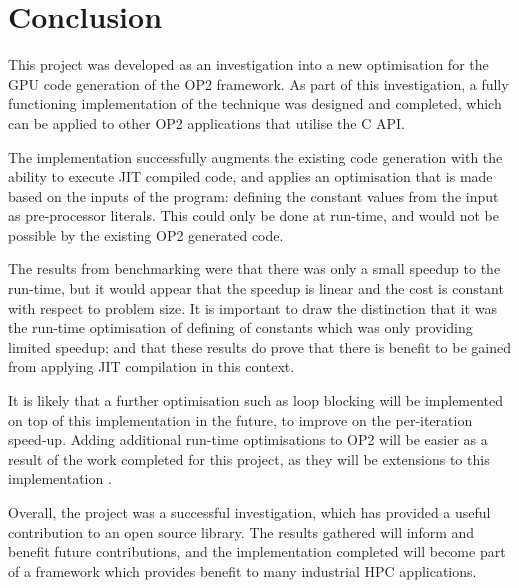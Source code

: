 
\section{Conclusion}
\label{s:conc}

This project was developed as an investigation into a new optimisation for the GPU code generation of the OP2 framework. As part of this investigation, a fully functioning implementation of the technique was designed and completed, which can be applied to other OP2 applications that utilise the C API. 
\par
The implementation successfully augments the existing code generation with the ability to execute JIT compiled code, and applies an optimisation that is made based on the inputs of the program: defining the constant values from the input as pre-processor literals. This could only be done at run-time, and would not be possible by the existing OP2 generated code.
\par
The results from benchmarking were that there was only a small speedup to the run-time, but it would appear that the speedup is linear and the cost is constant with respect to problem size. It is important to draw the distinction that it was the run-time optimisation of defining of constants which was only providing limited speedup; and that these results do prove that there is benefit to be gained from applying JIT compilation in this context.
\par
It is likely that a further optimisation such as loop blocking will be implemented on top of this implementation in the future, to improve on the per-iteration speed-up. Adding additional run-time optimisations to OP2 will be easier as a result of the work completed for this project, as they will be extensions to this implementation .
\par
Overall, the project was a successful investigation, which has provided a useful contribution to an open source library. The results gathered will inform and benefit future contributions, and the implementation completed will become part of a framework which provides benefit to many industrial HPC applications.
